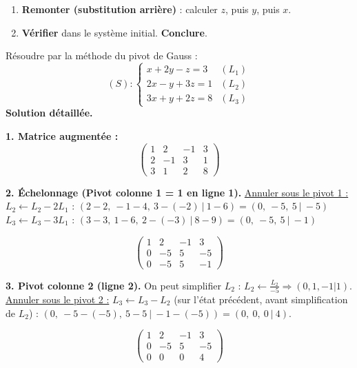 \documentclass[11pt]{article}
\begin{document}
\begin{methode}
\begin{enumerate}
\begin{itemize}
      \item $0\cdot z = 0$ $\Rightarrow$ \textbf{Infinité de solutions} (paramétrer).
      \item $a z = b$ ($a\neq 0$) $\Rightarrow$ \textbf{Solution unique} (remonter).
      \end{itemize}
\item \textbf{Remonter (substitution arrière)} : calculer $z$, puis $y$, puis $x$.
\item \textbf{Vérifier} dans le système initial. \textbf{Conclure}.
\end{enumerate}
\end{methode}

\begin{exoresolu}
Résoudre par la méthode du pivot de Gauss :
\[
(S) : \begin{cases}
x + 2y - z = 3 & (L_1) \\
2x - y + 3z = 1 & (L_2) \\
3x + y + 2z = 8 & (L_3)
\end{cases}
\]
\tcblower
\textbf{Solution détaillée.}

\noindent\textbf{1. Matrice augmentée :}
\[
\left(\begin{array}{ccc|c}
1 & 2 & -1 & 3 \\
2 & -1 & 3 & 1 \\
3 & 1 & 2 & 8
\end{array}\right)
\]

\noindent\textbf{2. Échelonnage (Pivot colonne 1 = 1 en ligne 1).}
\underline{Annuler sous le pivot 1 :}
$L_2 \leftarrow L_2 - 2L_1$ : $(2-2,\ -1-4,\ 3-(-2)\ |\ 1-6) = (0,\ -5,\ 5\ |\ -5)$
$L_3 \leftarrow L_3 - 3L_1$ : $(3-3,\ 1-6,\ 2-(-3)\ |\ 8-9) = (0,\ -5,\ 5\ |\ -1)$

\[
\left(\begin{array}{ccc|c}
1 & 2 & -1 & 3 \\
0 & -5 & 5 & -5 \\
0 & -5 & 5 & -1
\end{array}\right)
\]

\noindent\textbf{3. Pivot colonne 2 (ligne 2).} On peut simplifier $L_2$ : $L_2 \leftarrow \frac{L_2}{-5} \Rightarrow (0, 1, -1 | 1)$.
\underline{Annuler sous le pivot 2 :}
$L_3 \leftarrow L_3 - L_2$ (sur l'état précédent, avant simplification de $L_2$) :
$(0,\ -5-(-5),\ 5-5\ |\ -1-(-5)) = (0,\ 0,\ 0\ |\ 4)$.

\[
\left(\begin{array}{ccc|c}
1 & 2 & -1 & 3 \\
0 & -5 & 5 & -5 \\
0 & 0 & 0 & 4
\end{array}\right)
\]


\end{exoresolu}
\end{document}
